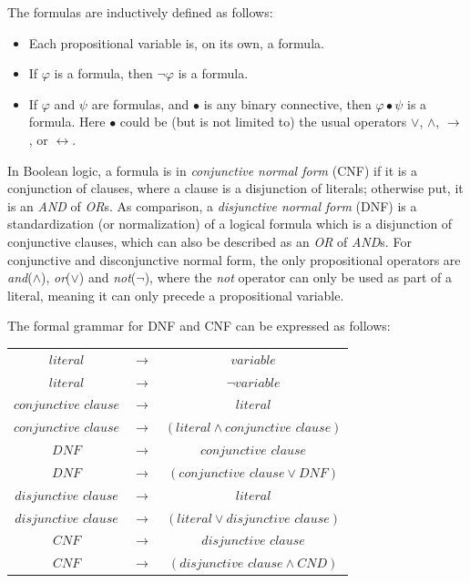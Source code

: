\documentclass[10pt,journal,final,]{article}
\theoremstyle{definition}
\begin{document}
The formulas are inductively defined as follows:
\begin{itemize}
\item Each propositional variable is, on its own, a formula.
\item If $\varphi$ is a formula, then $\neg \varphi$ is a formula.
\item If $\varphi$ and $\psi$ are formulas, and $\bullet$ is any binary connective, then $\varphi \bullet \psi$ is a formula. Here $\bullet$ could be (but is not limited to) the usual operators $\vee$, $\wedge$, $\to$, or $\leftrightarrow$.
\end{itemize}

In Boolean logic, a formula is in \textit{conjunctive normal form} (CNF) if it is a conjunction of clauses, where a clause is a disjunction of literals; otherwise put, it is an \textit{AND} of \textit{OR}s.
As comparison, a \textit{disjunctive normal form} (DNF) is a standardization (or normalization) of a logical formula which is a disjunction of conjunctive clauses, which can also be described as an \textit{OR} of \textit{AND}s.
For conjunctive and disconjunctive normal form, the only propositional operators are \textit{and}($\wedge$), \textit{or}($\vee$) and \textit{not}($\neg$), where the \textit{not} operator can only be used as part of a literal, meaning it can only precede a propositional variable.

The formal grammar for DNF and CNF can be expressed as follows:

\begin{tabular}{ccc}
$\textit{literal}$ & $\to$ & $\textit{variable}$ \\
$\textit{literal}$ & $\to$ & $\neg \textit{variable}$ \\
$\textit{conjunctive clause}$ & $\to$ & $\textit{literal}$ \\
$\textit{conjunctive clause}$ & $\to$ & $(\textit{literal} \wedge \textit{conjunctive clause})$ \\
$\textit{DNF}$ & $\to$ & $\textit{conjunctive clause}$ \\
$\textit{DNF}$ & $\to$ & $(\textit{conjunctive clause} \vee \textit{DNF})$ \\
$\textit{disjunctive clause}$ & $\to$ & $\textit{literal}$ \\
$\textit{disjunctive clause}$ & $\to$ & $(\textit{literal} \vee \textit{disjunctive clause})$ \\
$\textit{CNF}$ & $\to$ & $\textit{disjunctive clause}$ \\
$\textit{CNF}$ & $\to$ & $(\textit{disjunctive clause} \wedge \textit{CND})$
\end{tabular}
\end{document}

